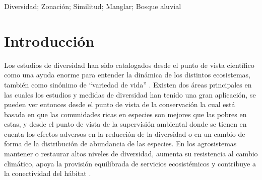 \documentclass[conference,final,12pt,]{IEEEtran}
\begin{document}
\begin{IEEEkeywords}
Diversidad; Zonación; Similitud; Manglar; Bosque aluvial
\end{IEEEkeywords}




\maketitle


%
\IEEEpeerreviewmaketitle


\hypertarget{introducciuxf3n}{%
\section{Introducción}\label{introducciuxf3n}}

Los estudios de diversidad han sido catalogados desde el punto de vista
científico como una ayuda enorme para entender la dinámica de los
distintos ecosistemas, también como sinónimo de ``variedad de vida''
\citep{A}. Existen dos áreas principales en las cuales los estudios y
medidas de diversidad han tenido una gran aplicación, se pueden ver
entonces desde el punto de vista de la conservación la cual está basada
en que las comunidades ricas en especies son mejores que las pobres en
estas, y desde el punto de vista de la supervisión ambiental donde se
tienen en cuenta los efectos adversos en la reducción de la diversidad o
en un cambio de forma de la distribución de abundancia de las
especies\citep{B}. En los agrosistemas mantener o restaurar altos niveles
de diversidad, aumenta su resistencia al cambio climático, apoya la
provisión equilibrada de servicios ecosistémicos y contribuye a la
conectividad del hábitat \citep{C}.
\end{document}
